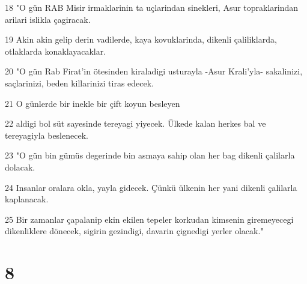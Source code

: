 \par 18 "O gün RAB Misir irmaklarinin ta uçlarindan sinekleri, Asur topraklarindan arilari islikla çagiracak.
\par 19 Akin akin gelip derin vadilerde, kaya kovuklarinda, dikenli çaliliklarda, otlaklarda konaklayacaklar.
\par 20 "O gün Rab Firat'in ötesinden kiraladigi usturayla -Asur Krali'yla- sakalinizi, saçlarinizi, beden killarinizi tiras edecek.
\par 21 O günlerde bir inekle bir çift koyun besleyen
\par 22 aldigi bol süt sayesinde tereyagi yiyecek. Ülkede kalan herkes bal ve tereyagiyla beslenecek.
\par 23 "O gün bin gümüs degerinde bin asmaya sahip olan her bag dikenli çalilarla dolacak.
\par 24 Insanlar oralara okla, yayla gidecek. Çünkü ülkenin her yani dikenli çalilarla kaplanacak.
\par 25 Bir zamanlar çapalanip ekin ekilen tepeler korkudan kimsenin giremeyecegi dikenliklere dönecek, sigirin gezindigi, davarin çignedigi yerler olacak."

\chapter{8}

